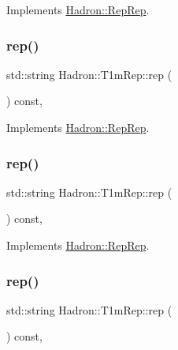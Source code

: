 Implements \mbox{\hyperlink{structHadron_1_1RepRep_ab3213025f6de249f7095892109575fde}{Hadron\+::\+Rep\+Rep}}.

\mbox{\label{structHadron_1_1T1mRep_ae8b584d4fdf7f81112d718a300fdbf5b}} 
\subsubsection{\texorpdfstring{rep()}{rep()}\hspace{0.1cm}{\footnotesize\ttfamily [3/5]}}
{\footnotesize\ttfamily std\+::string Hadron\+::\+T1m\+Rep\+::rep (\begin{DoxyParamCaption}{ }\end{DoxyParamCaption}) const\hspace{0.3cm}{\ttfamily [inline]}, {\ttfamily [virtual]}}



Implements \mbox{\hyperlink{structHadron_1_1RepRep_ab3213025f6de249f7095892109575fde}{Hadron\+::\+Rep\+Rep}}.

\mbox{\label{structHadron_1_1T1mRep_ae8b584d4fdf7f81112d718a300fdbf5b}} 
\subsubsection{\texorpdfstring{rep()}{rep()}\hspace{0.1cm}{\footnotesize\ttfamily [4/5]}}
{\footnotesize\ttfamily std\+::string Hadron\+::\+T1m\+Rep\+::rep (\begin{DoxyParamCaption}{ }\end{DoxyParamCaption}) const\hspace{0.3cm}{\ttfamily [inline]}, {\ttfamily [virtual]}}



Implements \mbox{\hyperlink{structHadron_1_1RepRep_ab3213025f6de249f7095892109575fde}{Hadron\+::\+Rep\+Rep}}.

\mbox{\label{structHadron_1_1T1mRep_ae8b584d4fdf7f81112d718a300fdbf5b}} 
\subsubsection{\texorpdfstring{rep()}{rep()}\hspace{0.1cm}{\footnotesize\ttfamily [5/5]}}
{\footnotesize\ttfamily std\+::string Hadron\+::\+T1m\+Rep\+::rep (\begin{DoxyParamCaption}{ }\end{DoxyParamCaption}) const\hspace{0.3cm}{\ttfamily [inline]}, {\ttfamily [virtual]}}



